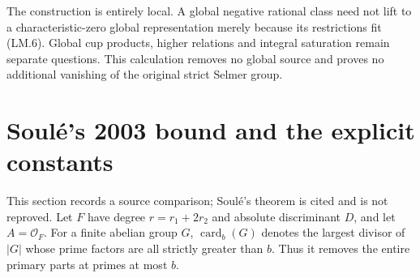 \documentclass[11pt,a4paper]{article}
\theoremstyle{definition}
\begin{document}
The construction is entirely local.  A global
negative rational class need not lift to a
characteristic-zero global representation merely
because its restrictions fit (LM.6).  Global cup
products, higher relations and integral saturation
remain separate questions.  This calculation
removes no global source and proves no additional
vanishing of the original strict Selmer group.



\section{Soul\'e's 2003 bound and the explicit constants}
\label{sec:soule}

This section records a source comparison; Soul\'e's theorem
is cited and is not reproved. Let $F$ have degree
$r=r_1+2r_2$ and absolute discriminant $D$, and let
$A=\mathcal O_F$. For a finite abelian group $G$,
$\operatorname{card}_b(G)$ denotes the largest divisor of
$|G|$ whose prime factors are all strictly greater than $b$.
Thus it removes the entire primary parts at primes at most $b$.
\end{document}
